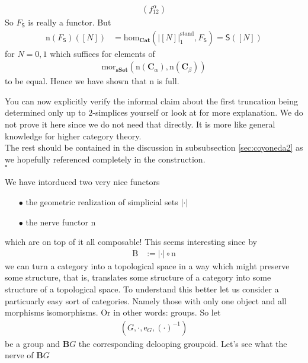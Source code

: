 \begin{prf}
\begin{description}
\begin{align*}
  \left(
    f_{12}^{\alpha}
  \right)
\end{align*}
So $F_{\mathsf{S}}$ is really a functor. But
\begin{align*}
  \mathrm{n}(F_{\mathsf{S}})([N])
  &=
  \mathrm{hom}_{\mathbf{Cat}}
  \left(
    \vert
      [N]
    \vert_{1}^{\textrm{stand}},
    F_{\mathsf{S}}
  \right)
  =
  \mathsf{S}([N])
\end{align*}
for $N = 0,1$ which suffices for elements of
\begin{align*}
  \mathrm{mor}_{\mathbf{sSet}}
  \left(
    \mathrm{n}(\mathbf{C}_{\alpha}),
    \mathrm{n}(\mathbf{C}_{\beta})
  \right)
\end{align*}
to be equal. Hence we have shown that $\mathrm{n}$ is full.
\end{description}
You can now explicitly verify the informal claim about the first truncation being determined only up to $2$-simplices yourself or look at \cite{d09756a3} for more explanation. We do not prove it here since we do not need that directly. It is more like general knowledge for higher category theory.
\\
The rest should be contained in the discussion in subsubsection \ref{sec:coyoneda2} as we hopefully referenced completely in the construction.
\\
\phantom{proven}
\hfill
$\square$
\end{prf}
We have intorduced two very nice functors
\begin{enumerate}
\item[$\bullet$]
the geometric realization of simplicial sets $\vert \cdot \vert$
\item[$\bullet$]
the nerve functor $\mathrm{n}$
\end{enumerate}
which are on top of it all composable! This seems interesting since by
\begin{align*}
  \mathrm{B}
  &:=
  \vert
    \cdot
  \vert
  \circ
  \mathrm{n}
\end{align*}
we can turn a category into a topological space in a way which might preserve some structure, that is, translates some structure of a category into some structure of a topological space. To understand this better let us consider a particuarly easy sort of categories. Namely those with only one object and all morphisms isomorphisms. Or in other words: groups. So let
\begin{align*}
  \left(
    G,
    \cdot,
    \mathrm{e}_{G},
    (\cdot)^{-1}
  \right)
\end{align*}
be a group and $\mathbf{B}G$ the corresponding delooping groupoid. Let's see what the nerve of $\mathbf{B}G$
